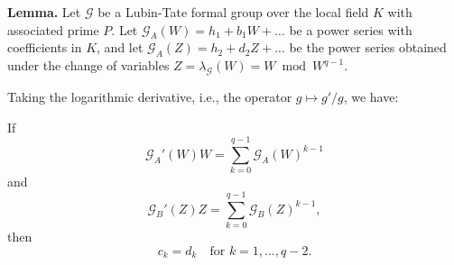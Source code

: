 \textbf{Lemma.} Let $\mathcal{G}$ be a Lubin-Tate formal group over the local field $K$ with associated prime $P$. Let $\mathcal{G}_A(W) = h_1 + b_1 W + \dots$ be a power series with coefficients in $K$, and let $\mathcal{G}_A(Z) = h_2 + d_2 Z + \dots$ be the power series obtained under the change of variables $Z = \lambda_{\mathcal{G}}(W) = W \bmod W^{q-1}$.

Taking the logarithmic derivative, i.e., the operator $g \mapsto g'/g$, we have:

If
$$\mathcal{G}_A'(W) W = \sum_{k=0}^{q-1} \mathcal{G}_A(W)^{k-1}$$
and
$$\mathcal{G}_B'(Z) Z = \sum_{k=0}^{q-1} \mathcal{G}_B(Z)^{k-1},$$
then
$$c_{k} = d_{k} \quad \text{for } k = 1, \dots, q-2.$$
